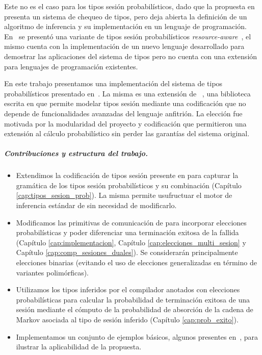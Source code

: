 Este no es el caso para los tipos sesión probabilísticos, dado que la
propuesta en~\cite{DBLP:conf/concur/InversoMPTT20} presenta un sistema de
chequeo de tipos, pero deja abierta la definición de un algoritmo de inferencia
y su implementación en un lenguaje de programación. En~\cite{DasDH20} se
presentó una variante de tipos sesión probabilísticos
\emph{resource-aware}~\cite{DasHP18}, el mismo cuenta con la implementación de
un nuevo lenguaje desarrollado para demostrar las aplicaciones del sistema de
tipos pero no cuenta con una extensión para lenguajes de programación
existentes.

En este trabajo presentamos una implementación del sistema de tipos
probabilísticos presentado en~\cite{DBLP:conf/concur/InversoMPTT20}. La misma
es una extensión de \FuSe~\cite{DBLP:journals/jfp/Padovani17}, una biblioteca
escrita en \OCaml que permite modelar tipos sesión mediante una codificación
que no depende de funcionalidades avanzadas del lenguaje anfitrión. La elección
fue motivada por la modularidad del proyecto y codificación que permitieron
una extensión al cálculo probabilístico sin perder las garantías del sistema
original.

\subparagraph*{Contribuciones y estructura del trabajo.}
\begin{itemize}

	\item Extendimos la codificación de tipos sesión presente en \FuSe para
		capturar la gramática de los tipos sesión probabilísticos y su
		combinación (Capítulo \ref{cap:tipos_sesion_prob}). La misma
		permite usufructuar el motor de inferencia estándar de \OCaml
		sin necesidad de modificarlo.

	\item Modificamos las primitivas de comunicación de \FuSe para
		incorporar elecciones probabilísticas y poder diferenciar una
		terminación exitosa de la fallida (Capítulo
		\ref{cap:implementacion}, Capítulo
		\ref{cap:elecciones_multi_sesion} y Capítulo
		\ref{cap:comp_sesiones_duales}). Se considerarán principalmente
		elecciones binarias (evitando el uso de elecciones
		generalizadas en término de variantes polimórficas).

	\item Utilizamos los tipos inferidos por el compilador anotados con
		elecciones probabilísticas para calcular la probabilidad de
		terminación exitosa de una sesión mediante el cómputo de la
		probabilidad de absorción de la cadena de Markov asociada al
		tipo de sesión inferido (Capítulo \ref{cap:prob_exito}).

	\item Implementamos un conjunto de ejemplos básicos, algunos presentes
		en~\cite{DBLP:conf/concur/InversoMPTT20}, para ilustrar la
		aplicabilidad de la propuesta.
\end{itemize}
